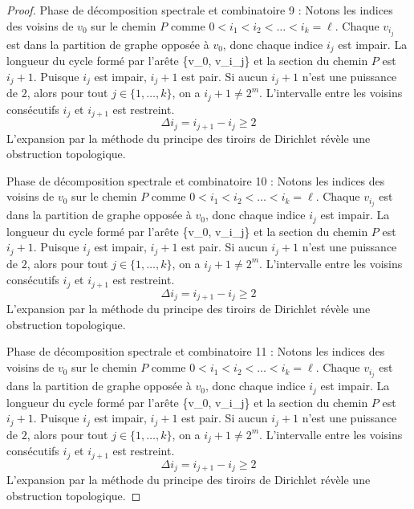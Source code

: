 \documentclass[11pt,a4paper]{article}
\theoremstyle{definition}
\begin{document}
\begin{proof}
Phase de décomposition spectrale et combinatoire 9 :
Notons les indices des voisins de $v_0$ sur le chemin $P$ comme $0 < i_1 < i_2 < \dots < i_k = \ell$.
Chaque $v_{i_j}$ est dans la partition de graphe opposée à $v_0$, donc chaque indice $i_j$ est impair.
La longueur du cycle formé par l'arête \{v_0, v_{i_j}\} et la section du chemin $P$ est $i_j + 1$.
Puisque $i_j$ est impair, $i_j + 1$ est pair.
Si aucun $i_j + 1$ n'est une puissance de $2$, alors pour tout $j \in \{1, \dots, k\}$, on a $i_j + 1 \neq 2^m$.
L'intervalle entre les voisins consécutifs $i_j$ et $i_{j+1}$ est restreint.
\begin{equation}
\Delta i_j = i_{j+1} - i_j \ge 2
\end{equation}
L'expansion par la méthode du principe des tiroirs de Dirichlet révèle une obstruction topologique.

Phase de décomposition spectrale et combinatoire 10 :
Notons les indices des voisins de $v_0$ sur le chemin $P$ comme $0 < i_1 < i_2 < \dots < i_k = \ell$.
Chaque $v_{i_j}$ est dans la partition de graphe opposée à $v_0$, donc chaque indice $i_j$ est impair.
La longueur du cycle formé par l'arête \{v_0, v_{i_j}\} et la section du chemin $P$ est $i_j + 1$.
Puisque $i_j$ est impair, $i_j + 1$ est pair.
Si aucun $i_j + 1$ n'est une puissance de $2$, alors pour tout $j \in \{1, \dots, k\}$, on a $i_j + 1 \neq 2^m$.
L'intervalle entre les voisins consécutifs $i_j$ et $i_{j+1}$ est restreint.
\begin{equation}
\Delta i_j = i_{j+1} - i_j \ge 2
\end{equation}
L'expansion par la méthode du principe des tiroirs de Dirichlet révèle une obstruction topologique.

Phase de décomposition spectrale et combinatoire 11 :
Notons les indices des voisins de $v_0$ sur le chemin $P$ comme $0 < i_1 < i_2 < \dots < i_k = \ell$.
Chaque $v_{i_j}$ est dans la partition de graphe opposée à $v_0$, donc chaque indice $i_j$ est impair.
La longueur du cycle formé par l'arête \{v_0, v_{i_j}\} et la section du chemin $P$ est $i_j + 1$.
Puisque $i_j$ est impair, $i_j + 1$ est pair.
Si aucun $i_j + 1$ n'est une puissance de $2$, alors pour tout $j \in \{1, \dots, k\}$, on a $i_j + 1 \neq 2^m$.
L'intervalle entre les voisins consécutifs $i_j$ et $i_{j+1}$ est restreint.
\begin{equation}
\Delta i_j = i_{j+1} - i_j \ge 2
\end{equation}
L'expansion par la méthode du principe des tiroirs de Dirichlet révèle une obstruction topologique.


\end{proof}
\end{document}
